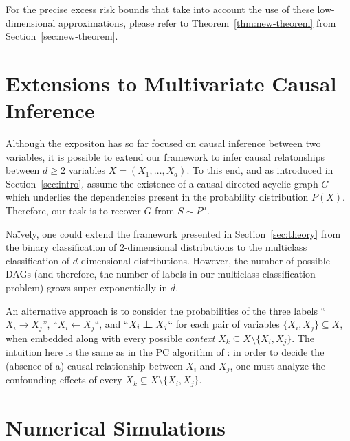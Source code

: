 \documentclass{article}
\newcommand{\indep}{\mathrel{\text{\scalebox{1.07}{$\perp\mkern-10mu\perp$}}}}
\begin{document}
For the precise excess risk bounds that take into account the use of these
low-dimensional approximations, please refer to Theorem~\ref{thm:new-theorem} from
Section~\ref{sec:new-theorem}.

\section{Extensions to Multivariate Causal Inference}\label{sec:dags}

Although the expositon has so far focused on causal inference between two
variables, it is possible to extend our framework to infer causal relatonships
between $d \geq 2$ variables $X=(X_1,\ldots,X_d)$. To this end, and as
introduced in Section~\ref{sec:intro}, assume the existence of a causal
directed acyclic graph $G$ which underlies the dependencies present in the
probability distribution $P(X)$. Therefore, our task is to recover $G$
from $S \sim P^n$.

Na\"ively, one could extend the framework presented in Section~\ref{sec:theory}
from the binary classification of $2$-dimensional distributions to the
multiclass classification of $d$-dimensional distributions. However, the number
of possible DAGs (and therefore, the number of labels in our multiclass
classification problem) grows super-exponentially in $d$.

An alternative approach is to consider the probabilities of the three labels
``$X_i \to X_j$'', ``$X_i \leftarrow X_j$``, and ``$X_i \indep X_j$`` for each
pair of variables $\{X_i,X_j\}\subseteq X$, when embedded along with every
possible \emph{context} $X_k \subseteq X \setminus \{X_i,X_j\}$. The intuition
here is the same as in the PC algorithm of \citet{Spirtes00}: in order to
decide the (absence of a) causal relationship between $X_i$ and $X_j$, one must
analyze the confounding effects of every $X_k \subseteq X \setminus
\{X_i,X_j\}$. 

\section{Numerical Simulations}\label{sec:exps}
\end{document}
